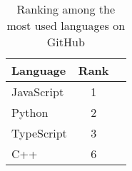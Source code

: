 \begin{table}[ht]
\centering
\caption{Ranking among the most used languages on GitHub \parencite{stateOfTheOctoverse23}}
\label{tab:githubMostUsedLanguageRanking23}
\begin{tabular}[t]{lcc}
\toprule
Language & Rank\\
\midrule
JavaScript & 1\\
Python & 2\\
TypeScript & 3\\
C++ & 6\\
\bottomrule
\end{tabular}
\end{table}
